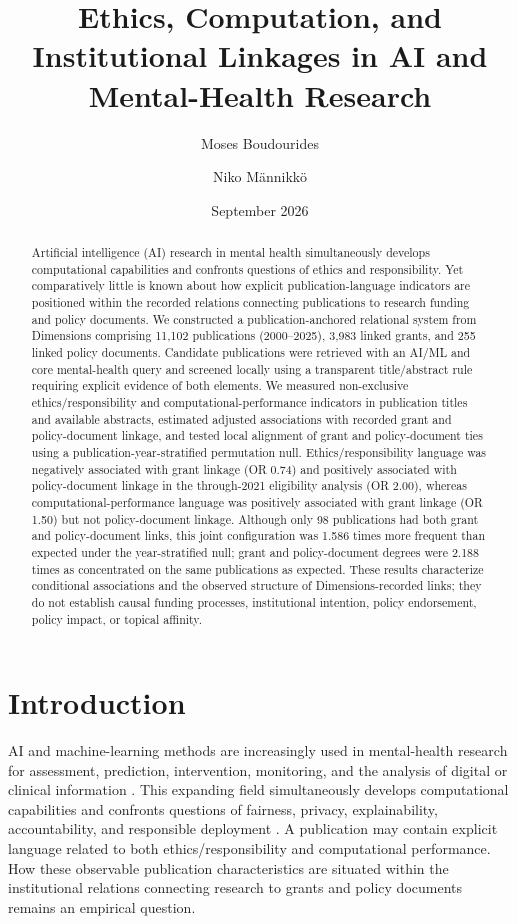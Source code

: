 \documentclass[12pt]{article}
\title{Ethics, Computation, and Institutional Linkages in AI and Mental-Health Research}
\author[1]{Moses Boudourides}
\author[2]{Niko M{\"a}nnikk{\"o}}
\affil[1]{School of Professional Studies, Northwestern University, Evanston, IL, USA%
\authorcr\texttt{Moses.Boudourides@northwestern.edu}}
\affil[2]{Centre for Research and Innovation, Oulu University of Applied Sciences, Finland%
\authorcr\texttt{mannikkon@gmail.com}}
\date{September 2026}
\begin{document}
\maketitle

\begin{abstract}
Artificial intelligence (AI) research in mental health simultaneously develops computational capabilities and confronts questions of ethics and responsibility. Yet comparatively little is known about how explicit publication-language indicators are positioned within the recorded relations connecting publications to research funding and policy documents. We constructed a publication-anchored relational system from Dimensions comprising 11,102 publications (2000--2025), 3,983 linked grants, and 255 linked policy documents. Candidate publications were retrieved with an AI/ML and core mental-health query and screened locally using a transparent title/abstract rule requiring explicit evidence of both elements. We measured non-exclusive ethics/responsibility and computational-performance indicators in publication titles and available abstracts, estimated adjusted associations with recorded grant and policy-document linkage, and tested local alignment of grant and policy-document ties using a publication-year-stratified permutation null. Ethics/responsibility language was negatively associated with grant linkage (OR 0.74) and positively associated with policy-document linkage in the through-2021 eligibility analysis (OR 2.00), whereas computational-performance language was positively associated with grant linkage (OR 1.50) but not policy-document linkage. Although only 98 publications had both grant and policy-document links, this joint configuration was 1.586 times more frequent than expected under the year-stratified null; grant and policy-document degrees were 2.188 times as concentrated on the same publications as expected. These results characterize conditional associations and the observed structure of Dimensions-recorded links; they do not establish causal funding processes, institutional intention, policy endorsement, policy impact, or topical affinity.
\end{abstract}

\section{Introduction}

AI and machine-learning methods are increasingly used in mental-health research for assessment, prediction, intervention, monitoring, and the analysis of digital or clinical information \citep{straw2020artificial,beg2025,raygozal2025}. This expanding field simultaneously develops computational capabilities and confronts questions of fairness, privacy, explainability, accountability, and responsible deployment \citep{bansal2026,carneiro2025,pardo2026}. A publication may contain explicit language related to both ethics/responsibility and computational performance. How these observable publication characteristics are situated within the institutional relations connecting research to grants and policy documents remains an empirical question.
\end{document}
